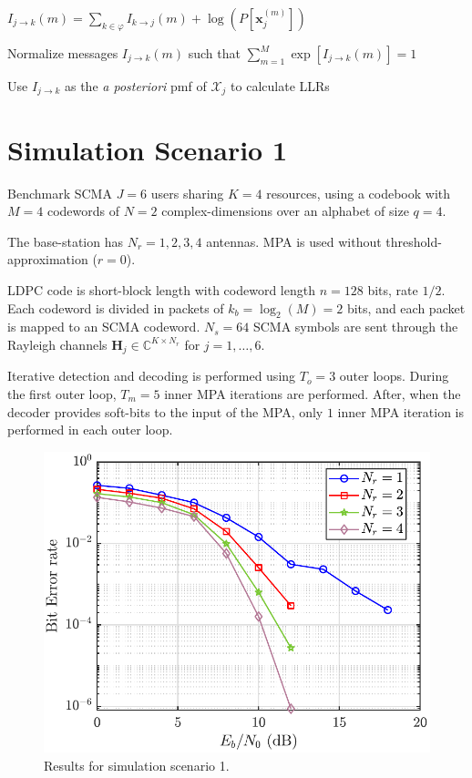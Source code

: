 \documentclass[10pt,oneside]{article}
\newcommand{\matlabComm}[1]{\Comment{\textcolor{ForestGreen}{#1}}}
\begin{document}
\begin{algorithm}[!htb]
\begin{algorithmic}
 					 \matlabComm{For every symbol of the codebook}
 						\State $I_{j \rightarrow k}(m) = \sum_{k\in \varphi} I_{k \rightarrow j}(m) + \log\left(P[\mathbf{x}_j^{(m)}]\right)$
 					\EndFor %
 				\EndFor %
 				
 				\State Normalize messages $I_{j \rightarrow k}(m)$ such that $\sum\limits_{m=1}^M \exp\left[I_{j \rightarrow k}(m)\right]=1$
 			
 				\If{$t=T_m$} 
 					\State Use $I_{j \rightarrow k}$ as the \textit{a posteriori} pmf of $\mathcal{X}_j$ to calculate LLRs
 				\EndIf
 				
 			\EndFor %
 		
 		\EndFor  %
 		\EndProcedure
 	\end{algorithmic}
 \end{algorithm}
 
 
 \section{Simulation Scenario 1}
 
Benchmark SCMA $J=6$ users sharing $K=4$ resources, using a codebook with $M=4$ codewords of $N=2$ complex-dimensions over an alphabet of size $q=4$. 
 
 The base-station has $N_r={1,2,3,4}$ antennas. MPA is used without threshold-approximation ($r=0$). 
 
 LDPC code is short-block length with codeword length $n=128$ bits, rate $1/2$. Each codeword is divided in packets of $k_b=\log_2(M)=2$ bits, and each packet is mapped to an SCMA codeword. $N_s=64$ SCMA symbols are sent through the Rayleigh channels $\mathbf{H}_j \in \mathds{C}^{K\times N_r}$ for $j=1,\ldots,6$. 
 
 Iterative detection and decoding is performed using $T_o=3$ outer loops. During the first outer loop, $T_m=5$ inner MPA iterations are performed. After, when the decoder provides soft-bits to the input of the MPA, only $1$ inner MPA iteration is performed in each outer loop.
 
 \begin{figure}[h]
 	\centering
 	\includegraphics[scale=1]{SCMA_TB_ESGA_Many_Rx_BitErrorRate.pdf}
 	\caption[]{Results for simulation scenario 1.}
 	\label{fig:bipartitegraphoff}
 \end{figure}
 
\end{document}
